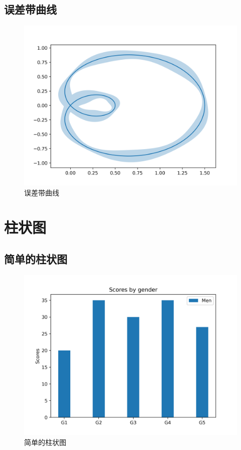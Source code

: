\documentclass[openany]{progbookcn}
\begin{document}
\subsection{误差带曲线}

\begin{figure}[H]
\centering
\includegraphics[width=0.6 \textwidth]{figs/chapter9/lines/ErrorBandCurve}
\caption{误差带曲线}
\end{figure}



\section{柱状图}
\subsection{简单的柱状图}

\begin{figure}[H]
\centering
\includegraphics[width=0.6 \textwidth]{figs/chapter9/bars/SimpleBar}
\caption{简单的柱状图}
\end{figure}
\end{document}

